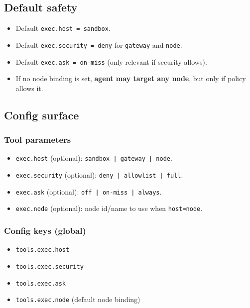 \subsection{Default safety}


\begin{itemize}
  \item Default \texttt{exec.host = sandbox}.
  \item Default \texttt{exec.security = deny} for \texttt{gateway} and \texttt{node}.
  \item Default \texttt{exec.ask = on-miss} (only relevant if security allows).
  \item If no node binding is set, \textbf{agent may target any node}, but only if policy allows it.
\end{itemize}


\subsection{Config surface}


\subsubsection{Tool parameters}


\begin{itemize}
  \item \texttt{exec.host} (optional): \texttt{sandbox | gateway | node}.
  \item \texttt{exec.security} (optional): \texttt{deny | allowlist | full}.
  \item \texttt{exec.ask} (optional): \texttt{off | on-miss | always}.
  \item \texttt{exec.node} (optional): node id/name to use when \texttt{host=node}.
\end{itemize}


\subsubsection{Config keys (global)}


\begin{itemize}
  \item \texttt{tools.exec.host}
  \item \texttt{tools.exec.security}
  \item \texttt{tools.exec.ask}
  \item \texttt{tools.exec.node} (default node binding)
\end{itemize}


